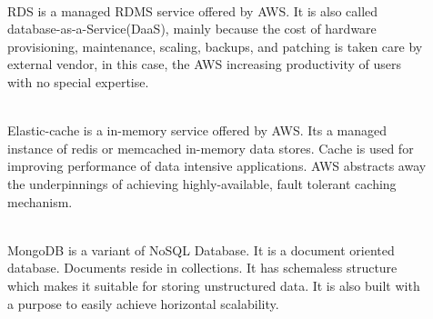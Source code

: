 \begin{description}
  \item[{Relational Database Service (RDS)] \hfill \\
      RDS is a managed RDMS service offered by AWS. It is also called database-as-a-Service(DaaS), mainly
      because the cost of hardware provisioning, maintenance, scaling, backups, and patching is taken
      care by external vendor, in this case, the AWS increasing productivity of users with no special
      expertise.

  \item[{Elastic Cache] \hfill \\
      Elastic-cache is a in-memory service offered by AWS. Its a managed instance of redis or memcached
      in-memory data stores. Cache is used for improving performance of data intensive applications.
      AWS abstracts away the underpinnings of achieving highly-available, fault tolerant caching mechanism.


  \item[{MongoDB] \hfill \\
      MongoDB is a variant of NoSQL Database. It is a document oriented database. Documents reside in
      collections. It has schemaless structure which makes it suitable for storing unstructured data.
      It is also built with a purpose to easily achieve horizontal scalability.
\end{description}


\pagebreak


